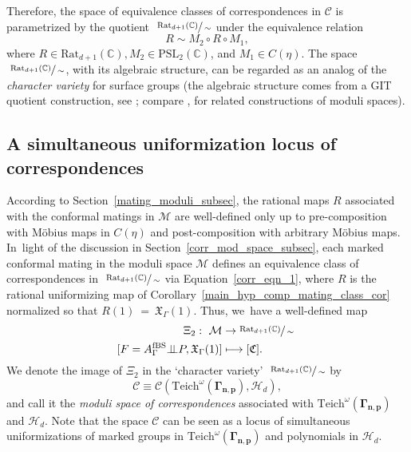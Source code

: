 \documentclass[JEP,XML,SOM,Unicode,NoFloatCountersInSection,published]{cedram}
\def\mto{\mathchoice{\longmapsto}{\mapsto}{\mapsto}{\mapsto}}
\let\faktor\sfrac
\theoremstyle{definition}
\theoremstyle{remark}
\newcommand{\C}{\mathbb{C}}
\newcommand{\pslc}{{\mathrm{PSL}_2 (\mathbb{C})}}
\newcommand{\cC}{\mathcal{C}}
\newcommand{\cM}{\mathcal{M}}
\newcommand{\mate}{\bot \!\! \! {\bot}}
\begin{document}
Therefore, the space of equivalence classes of correspondences in $\mathscr{C}$ is parametrized by the quotient $\ \faktor{\mathrm{Rat}_{d+1}(\C)}{\sim}$ under the equivalence relation
\[
R\sim M_2\circ R\circ M_1,
\]
where $R\in \mathrm{Rat}_{d+1}(\C), M_2\in\pslc$, and $M_1\in C(\eta)$.
The space $\ \faktor{\mathrm{Rat}_{d+1}(\C)}{\sim}$, with its algebraic structure, can be regarded as an analog of the \emph{character variety}
for surface groups (the algebraic structure comes from a GIT quotient construction, see \cite{Mum65}; compare \cite[\S 4.3]{Kap01}, \cite{LM85} for related constructions of moduli spaces).

\subsection{A simultaneous uniformization locus of correspondences}\label{simult_unif_corr_subsec}

According to Section~\ref{mating_moduli_subsec}, the rational maps $R$ associated with the conformal matings in $\cM$ are well-defined only up to pre-composition with Möbius maps in $C(\eta)$ and post-composition with arbitrary Möbius maps. In~light of the discussion in Section~\ref{corr_mod_space_subsec}, each marked conformal mating in the moduli space $\cM$ defines an equivalence class of correspondences in $\ \faktor{\mathrm{Rat}_{d+1}(\C)}{\sim}$ via Equation~\eqref{corr_eqn_1}, where $R$ is the rational uniformizing map of Corollary~\ref{main_hyp_comp_mating_class_cor} normalized so that $R(1)~=~\mathfrak{X}_\Gamma(1)$. Thus, we~have a well-defined map
\begin{equation*}
\begin{split}
\Xi_2:\ \cM & \to \faktor{\mathrm{Rat}_{d+1}(\C)}{\sim}\ \\
[F= A_{\Gamma}^{\mathrm{fBS}}\mate P, \mathfrak{X}_\Gamma(1)] & \mto [\mathfrak{C}].
\end{split}
\label{mating_to_corr}
\end{equation*}
We denote the image of $\Xi_2$ in the `character variety' $\ \faktor{\mathrm{Rat}_{d+1}(\C)}{\sim}$ by
\[
\cC\equiv \cC(\mathrm{Teich}^\omega(\pmb{\Gamma_{n,p}}),\mathcal{H}_{d}),
\]
and call it the \emph{moduli space of correspondences} associated with $\mathrm{Teich}^\omega(\pmb{\Gamma_{n,p}})$ and $\mathcal{H}_{d}$. Note that the space $\cC$ can be seen as a locus of simultaneous uniformizations of marked groups in $\mathrm{Teich}^\omega(\pmb{\Gamma_{n,p}})$ and polynomials in $\mathcal{H}_{d}$.
\end{document}
